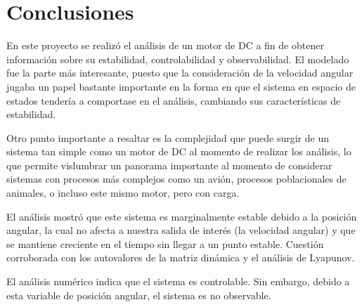 
\section{Conclusiones}

En este proyecto se realizó el análisis de un motor de DC a fin de obtener
información sobre su estabilidad, controlabilidad y observabilidad. El modelado
fue la parte más interesante, puesto que la consideración de la velocidad angular
jugaba un papel bastante importante en la forma en que el sistema en espacio 
de estados tendería a comportase en el análisis, cambiando sus características
de estabilidad.

Otro punto importante a resaltar es la complejidad que puede surgir de un sistema
tan simple como un motor de DC al momento de realizar los análisis, lo que permite
vislumbrar un panorama importante al momento de considerar sistemas con procesos
más complejos como un avión, procesos poblacionales de animales, o incluso este
mismo motor, pero con carga.

El análisis mostró que este sistema es marginalmente estable debido a la posición
angular, la cual no afecta a nuestra salida de interés (la velocidad angular) y que
se mantiene creciente en el tiempo sin llegar a un punto estable. Cuestión corroborada
con los autovalores de la matriz dinámica y el análisis de Lyapunov.

El análisis numérico indica que el sistema es controlable. Sin embargo, debido a esta variable de posición angular,
el sistema es no observable.
